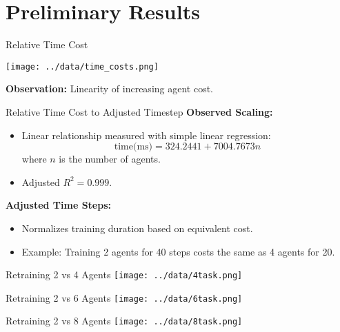 \documentclass[xcolor={svgnames}]{beamer}
\begin{document}
\section{Preliminary Results}


\begin{frame}{Relative Time Cost}
    \begin{center}
        \texttt{[image: ../data/time\_costs.png]}
    \end{center}
    \textbf{Observation:} Linearity of increasing agent cost.
\end{frame}



\begin{frame}{Relative Time Cost to Adjusted Timestep}
    \textbf{Observed Scaling:}
    \begin{itemize}
        \item Linear relationship measured with simple linear regression:
        \[ \text{time(ms)} = 324.2441 + 7004.7673n \]
        where \(n\) is the number of agents.
        \item Adjusted \(R^2=0.999\).
    \end{itemize}
    
    \textbf{Adjusted Time Steps:}
    \begin{itemize}
        \item Normalizes training duration based on equivalent cost.
        \item Example: Training 2 agents for 40 steps costs the same as 4 agents for 20.
    \end{itemize}
\end{frame}

\begin{frame}{Retraining 2 vs 4 Agents}
    \texttt{[image: ../data/4task.png]}
\end{frame}

\begin{frame}{Retraining 2 vs 6 Agents}
    \texttt{[image: ../data/6task.png]}
\end{frame}

\begin{frame}{Retraining 2 vs 8 Agents}
    \texttt{[image: ../data/8task.png]}
\end{frame}
\end{document}
